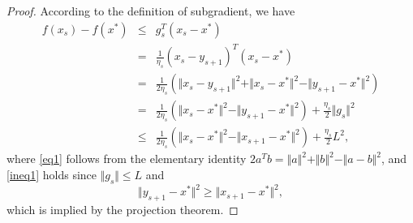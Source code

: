 \documentclass[10pt,a4paper]{amsart}
\begin{document}
\begin{proof}
	According to the definition of subgradient, we have
	\begin{eqnarray}
			f(x_s)-f(x^*)&\le& g_s^T(x_s-x^*) \nonumber \\
			&=& \frac{1}{\eta_s}(x_s-y_{s+1})^T(x_s-x^*) \nonumber\\
			&=& \frac{1}{2\eta_s}(\Vert x_s-y_{s+1} \Vert^2+\Vert x_s-x^* \Vert^2-\Vert y_{s+1}-x^* \Vert^2)\label{eq1}\\
			&=& \frac{1}{2\eta_s}(\Vert x_s-x^* \Vert^2-\Vert y_{s+1}-x^* \Vert^2)+\frac{\eta_s}{2}\Vert g_s \Vert^2 \nonumber\\
&\le& \frac{1}{2\eta_s}(\Vert x_s-x^* \Vert^2-\Vert x_{s+1}-x^* \Vert^2)+\frac{\eta_s}{2}L^2,\label{ineq1}
	\end{eqnarray}
where \eqref{eq1} follows from the elementary identity $2a^Tb=\Vert a\Vert^2+\Vert b\Vert^2-\Vert a-b\Vert^2$, and \eqref{ineq1} holds since $\Vert g_s \Vert \le L$ and
	\begin{equation*}
		\Vert y_{s+1}-x^* \Vert^2\ge \Vert x_{s+1}-x^* \Vert^2,
	\end{equation*}
which is implied by  the projection theorem.


\end{proof}
\end{document}
